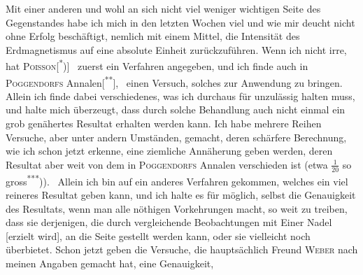 Mit einer anderen und wohl an sich nicht viel weniger wichtigen Seite
des Gegenstandes habe ich mich in den letzten Wochen viel und wie mir
deucht nicht ohne Erfolg beschäftigt, nemlich mit einem Mittel, die Intensität
\clearpage{}\HistoricalFoot{}{10\textsuperscript{*}}
\noindent des Erdmagnetismus auf eine absolute Einheit zurückzuführen. Wenn ich
nicht irre, hat \textsc{Poisson}[\textsuperscript{*})]\begingroup\renewcommand{\thefootnote}{}
\endgroup\ zuerst ein Verfahren angegeben, und ich finde auch
in \textsc{Poggendorfs} Annalen[\textsuperscript{**}],\begingroup\renewcommand{\thefootnote}{}
\endgroup\ einen Versuch, solches zur Anwendung zu bringen.
Allein ich finde dabei verschiedenes, was ich durchaus für unzulässig halten
muss, und halte mich überzeugt, dass durch solche Behandlung auch nicht
einmal ein grob genähertes Resultat erhalten werden kann. Ich habe mehrere
Reihen Versuche, aber unter andern Umständen, gemacht, deren schärfere
Berechnung, wie ich schon jetzt erkenne, eine ziemliche Annäherung geben
werden, deren Resultat aber weit von dem in \textsc{Poggendorfs} Annalen verschieden
ist (etwa \(\frac{1}{20}\) so gross\textsuperscript{***})).\begingroup\renewcommand{\thefootnote}{}
\endgroup\ Allein ich bin auf ein anderes Verfahren gekommen,
welches ein viel reineres Resultat geben kann, und ich halte es für möglich,
selbst die Genauigkeit des Resultats, wenn man alle nöthigen Vorkehrungen
macht, so weit zu treiben, dass sie derjenigen, die durch vergleichende Beobachtungen
mit Einer Nadel [erzielt wird], an die Seite gestellt werden kann,
oder sie vielleicht noch überbietet. Schon jetzt geben die Versuche, die hauptsächlich
Freund \textsc{Weber} nach meinen Angaben gemacht hat, eine Genauigkeit,

